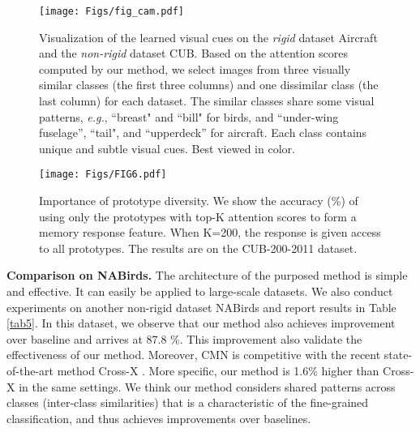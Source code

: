 \documentclass[journal]{IEEEtran}
\begin{document}
\begin{figure*}[t]
\begin{center}
\texttt{[image: Figs/fig\_cam.pdf]}
\end{center}
\caption{Visualization of the learned visual cues on the \emph{rigid} dataset Aircraft and the \emph{non-rigid} dataset CUB. Based on the attention scores computed by our method, we select images from three visually similar classes (the first three columns) and one dissimilar class (the last column) for each dataset. The similar classes share some visual patterns, \emph{e.g.}, ``breast" and ``bill" for birds, and ``under-wing fuselage'', ``tail", and ``upperdeck'' for aircraft.  Each class contains unique and subtle visual cues. Best viewed in color.}
\label{fig_cam}
\end{figure*}
\begin{figure}[t]
    \centering
   {\texttt{[image: Figs/FIG6.pdf]}}\caption{Importance of prototype diversity. We show the accuracy (\%) of using only the prototypes with top-K attention scores to form a memory response feature. When K=200, the response is given access to all prototypes. The results are on the CUB-200-2011 dataset.}
    \label{fig_ab}\end{figure}


\textbf{Comparison on NABirds.} The architecture of the purposed method is simple and effective. It can easily be applied to large-scale datasets. We also conduct experiments on another non-rigid dataset NABirds and report results in Table \ref{tab5}. In this dataset, we observe that our method also achieves  improvement over baseline and arrives at 87.8 \%. This improvement also validate the effectiveness of our method. Moreover, CMN is competitive with the recent state-of-the-art method Cross-X \cite{luo2019cross}. More specific, our method is 1.6\% higher than Cross-X in the same settings.
We think our method considers shared patterns across classes (inter-class similarities) that is a characteristic of the fine-grained classification, and thus achieves improvements over baselines. 
\end{document}
